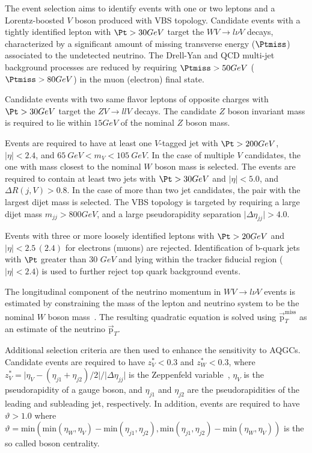 The event selection aims to identify events with one or two leptons and a Lorentz-boosted $V$ boson produced with VBS topology. Candidate events with a tightly identified lepton with $\Pt>30GeV$ target the $W V \rightarrow l \nu V$ decays, characterized by a significant amount of missing transverse energy ($\Ptmiss$) associated to the undetected neutrino. The Drell-Yan and QCD multi-jet background processes are reduced by requiring $\Ptmiss>50GeV$ ($\Ptmiss>80GeV$) in the muon (electron) final state. 

Candidate events with two same flavor leptons of opposite charges with  $\Pt>30GeV$ target the  $Z V \rightarrow l l V$ decays. The candidate $Z$ boson invariant mass is required to lie within $15GeV$ of the nominal $Z$ boson mass.

Events are required to have at least one $V$-tagged jet with $\Pt>200GeV$, $\mathopen|\eta \mathclose|<2.4$, and $65~GeV < m_{V} < 105~GeV$. In the case of multiple $V$ candidates, the one with mass closest to the nominal $W$ boson mass is selected.  The events are required to contain at least two jets with $\Pt>30GeV$ and $\mathopen|\eta\mathclose|<5.0$, and $\Delta R(j,V)>0.8$. In the case of more than two jet candidates, the pair with the largest dijet mass is selected. The VBS topology is targeted by requiring a large dijet mass $m_{jj}>800GeV$, and a large pseudorapidity separation $\mathopen|\Delta \eta_{jj}\mathclose|>4.0$.  

Events with three or more loosely identified leptons with $\Pt>20GeV$ and $\mathopen|\eta \mathclose|<2.5\,(2.4)$ for electrons (muons) are rejected. Identification of b-quark jets with $\Pt$ greater than 30 $GeV$ and lying within the tracker fiducial region ($\left|\eta\right|<2.4$)  is used to further reject top quark background events.   

The longitudinal component of the neutrino momentum in $W V \rightarrow l \nu V$ events is estimated by constraining the mass of the lepton and neutrino system to be the nominal $W$ boson mass~\cite{Sirunyan:2018iff}. The resulting quadratic equation is solved using $\vec{\mathrm{p}}_{T}^{\mathrm{miss}}$ as an estimate of the neutrino $\vec{\mathrm{p}}_{T}$.

Additional selection criteria are then used to enhance the sensitivity to AQGCs. Candidate events are required to have  $z_{V}^{*} < 0.3$ and $z_{W}^{*} < 0.3$, where $z_{V}^{*} = \mathopen|\eta_{V}-(\eta_{j1}+\eta_{j2})/2\mathclose|/\mathopen|\Delta \eta_{jj}\mathclose|$ is the Zeppenfeld variable~\cite{Rainwater:1996ud}, $\eta_{V}$ is the
pseudorapidity of a gauge boson, and $\eta_{j1}$ and $\eta_{j2}$ are the pseudorapidities of the leading and subleading jet, respectively. In addition, events are required to have $\vartheta>1.0$ where $\vartheta = \mathrm{min}(\mathrm{min}(\eta_{W},\eta_{V})-\mathrm{min}(\eta_{j1},\eta_{j2}),\mathrm{min}(\eta_{j1},\eta_{j2})-\mathrm{min}(\eta_{W},\eta_{V}))$ is the so called boson centrality. 

